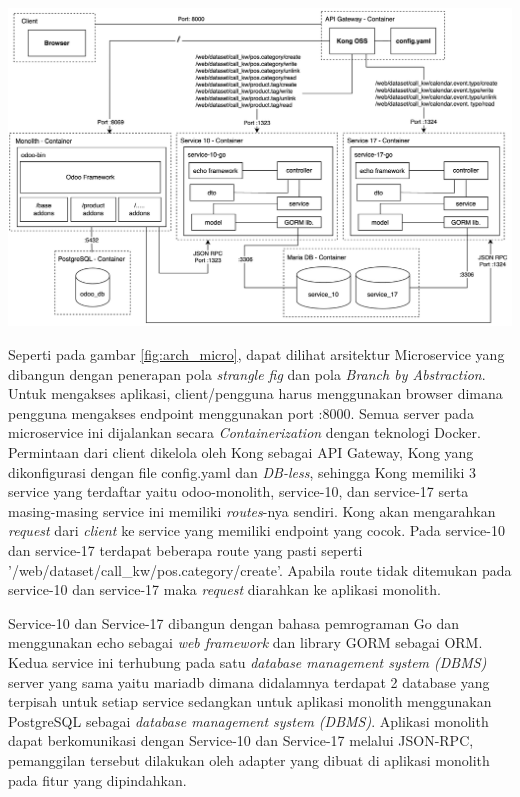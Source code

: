 \begin{center}
	\includegraphics[width=14cm]{img/bab_4/architectural_diag.png}
	\label{fig:arch_micro}
\end{center}

Seperti pada gambar \ref{fig:arch_micro}, dapat dilihat arsitektur Microservice yang dibangun dengan penerapan pola \textit{strangle fig} dan pola \textit{Branch by Abstraction}. Untuk mengakses aplikasi, client/pengguna harus menggunakan browser dimana pengguna mengakses endpoint menggunakan port :8000. Semua server pada microservice ini dijalankan secara \textit{Containerization} dengan teknologi Docker.  Permintaan dari client dikelola oleh Kong sebagai API Gateway, Kong yang dikonfigurasi dengan file config.yaml dan \textit{DB-less}, sehingga  Kong memiliki 3 service yang terdaftar yaitu odoo-monolith, service-10, dan service-17 serta masing-masing service ini memiliki \textit{routes}-nya sendiri. Kong akan mengarahkan \textit{request} dari \textit{client} ke service yang memiliki endpoint yang cocok. Pada service-10 dan service-17 terdapat beberapa route yang pasti seperti '/web/dataset/call\_kw/pos.category/create'. Apabila route tidak ditemukan pada service-10 dan service-17 maka \textit{request} diarahkan ke aplikasi monolith. 

Service-10 dan Service-17 dibangun dengan bahasa pemrograman Go dan menggunakan echo sebagai \textit{web framework} dan library GORM sebagai ORM. Kedua service ini terhubung pada satu \textit{database management system (DBMS)} server yang sama yaitu mariadb dimana didalamnya terdapat 2 database yang terpisah untuk setiap service sedangkan untuk aplikasi monolith menggunakan PostgreSQL sebagai \textit{database management system (DBMS)}. Aplikasi monolith dapat berkomunikasi dengan Service-10 dan Service-17 melalui JSON-RPC, pemanggilan tersebut dilakukan oleh adapter yang dibuat di aplikasi monolith pada fitur yang dipindahkan.

